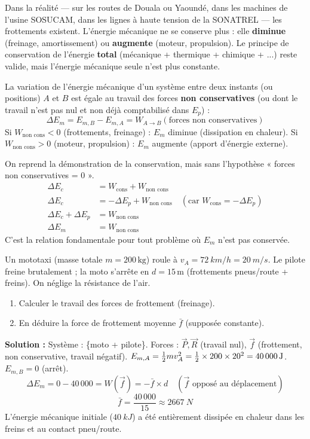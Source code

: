 \documentclass[11pt]{article}
\begin{document}
Dans la réalité — sur les routes de Douala ou Yaoundé, dans les machines de l'usine SOSUCAM, dans les lignes à haute tension de la SONATREL — les frottements existent. L'énergie mécanique ne se conserve plus : elle \textbf{diminue} (freinage, amortissement) ou \textbf{augmente} (moteur, propulsion). Le principe de conservation de l'énergie \textbf{total} (mécanique + thermique + chimique + ...) reste valide, mais l'énergie mécanique seule n'est plus constante.

\begin{propriete}
La variation de l'énergie mécanique d'un système entre deux instants (ou positions) $A$ et $B$ est égale au travail des forces \textbf{non conservatives} (ou dont le travail n'est pas nul et non déjà comptabilisé dans $E_p$) :
\[
\Delta E_m = E_{m,B} - E_{m,A} = W_{A\to B}(\text{forces non conservatives})
\]
Si $W_{\text{non cons}} < 0$ (frottements, freinage) : $E_m$ diminue (dissipation en chaleur).
Si $W_{\text{non cons}} > 0$ (moteur, propulsion) : $E_m$ augmente (apport d'énergie externe).
\end{propriete}

\begin{experience}[Démonstration : $\Delta E_m = W_{\text{non cons}}$]
On reprend la démonstration de la conservation, mais sans l'hypothèse « forces non conservatives = 0 ».
\begin{align*}
\Delta E_c &= W_{\text{cons}} + W_{\text{non cons}} \\
\Delta E_c &= -\Delta E_p + W_{\text{non cons}} \quad (\text{car } W_{\text{cons}} = -\Delta E_p) \\
\Delta E_c + \Delta E_p &= W_{\text{non cons}} \\
\Delta E_m &= W_{\text{non cons}}
\end{align*}
C'est la relation fondamentale pour tout problème où $E_m$ n'est pas conservée.
\end{experience}

\begin{exemplebox}
Un mototaxi (masse totale $m = 200\,\text{kg}$) roule à $v_A = \SI{72}{km/h} = \SI{20}{m/s}$. Le pilote freine brutalement ; la moto s'arrête en $d = 15\,\text{m}$ (frottements pneus/route + freins). On néglige la résistance de l'air.
\begin{enumerate}
    \item Calculer le travail des forces de frottement (freinage).
    \item En déduire la force de frottement moyenne $\bar{f}$ (supposée constante).
\end{enumerate}
\textbf{Solution :}
Système : \{moto + pilote\}. Forces : $\vec{P}, \vec{R}$ (travail nul), $\vec{f}$ (frottement, non conservative, travail négatif).
$E_{m,A} = \frac{1}{2}mv_A^2 = \frac{1}{2} \times 200 \times 20^2 = \SI{40\,000}{J}$. $E_{m,B} = 0$ (arrêt).
\[
\Delta E_m = 0 - 40\,000 = W(\vec{f}) = -\bar{f} \times d \quad (\vec{f} \text{ opposé au déplacement})
\]
\[
\bar{f} = \frac{40\,000}{15} \approx \SI{2667}{N}
\]
L'énergie mécanique initiale ($\SI{40}{kJ}$) a été entièrement dissipée en chaleur dans les freins et au contact pneu/route.
\end{exemplebox}
\end{document}
